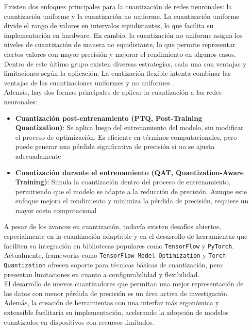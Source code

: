 \documentclass[a4paper,11pt, oneside]{article}
\begin{document}
Existen dos enfoques principales para la cuantización de redes neuronales: la cuantización uniforme y la cuantización no uniforme. La cuantización uniforme divide el rango de valores en intervalos equidistantes, lo que facilita su implementación en hardware. En cambio, la cuantización no uniforme asigna los niveles de cuantización de manera no equidistante, lo que permite representar ciertos valores con mayor precisión y mejorar el rendimiento en algunos casos. Dentro de este último grupo existen diversas estrategias, cada una con ventajas y limitaciones según la aplicación. La cuatización flexible intenta combinar las ventajas de las cuantizaciones uniformes y no uniformes \cite{SAYOOD2018257} \cite{electronics13101923}. \\

Además, hay dos formas principales de aplicar la cuantización a las redes neuronales:

\begin{itemize}
    \item \textbf{Cuantización post-entrenamiento (PTQ, Post-Training Quantization)}: Se aplica luego del entrenamiento del modelo, sin modificar el proceso de optimización. Es eficiente en términos computacionales, pero puede generar una pérdida significativa de precisión si no se ajusta adecuadamente \cite{tensorflow-ptq}

    \item \textbf{Cuantización durante el entrenamiento (QAT, Quantization-Aware Training)}: Simula la cuantización dentro del proceso de entrenamiento, permitiendo que el modelo se adapte a la reducción de precisión. Aunque este enfoque mejora el rendimiento y minimiza la pérdida de precisión, requiere un mayor costo computacional \cite{tensorflow-qat}

\end{itemize}


A pesar de los avances en cuantización, todavía existen desafíos abiertos, especialmente en la cuantización adaptable y en el desarrollo de herramientas que faciliten su integración en bibliotecas populares como \texttt{TensorFlow} y \texttt{PyTorch}. Actualmente, frameworks como \texttt{TensorFlow Model Optimization} \cite{tensorflow-model-optimization} y \texttt{Torch Quantization} \cite{pytorch-quantization} ofrecen soporte para técnicas básicas de cuantización, pero presentan limitaciones en cuanto a configurabilidad y flexibilidad. \\

El desarrollo de nuevos cuantizadores que permitan una mejor representación de los datos con menor pérdida de precisión es un área activa de investigación. Además, la creación de herramientas con una interfaz más ergonómica y extensible facilitaría su implementación, acelerando la adopción de modelos cuantizados en dispositivos con recursos limitados. \\
\end{document}
